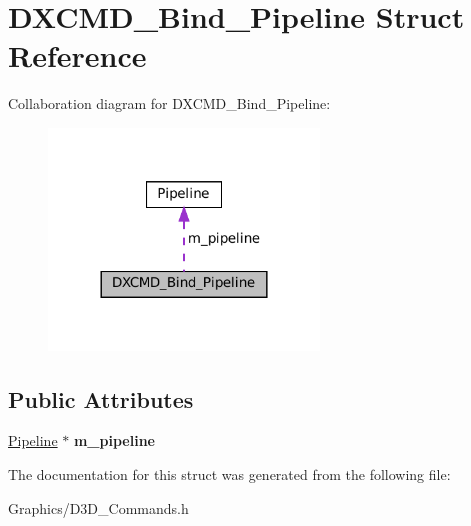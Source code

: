 \hypertarget{structDXCMD__Bind__Pipeline}{}\section{D\+X\+C\+M\+D\+\_\+\+Bind\+\_\+\+Pipeline Struct Reference}
\label{structDXCMD__Bind__Pipeline}


Collaboration diagram for D\+X\+C\+M\+D\+\_\+\+Bind\+\_\+\+Pipeline\+:
\nopagebreak
\begin{figure}[H]
\begin{center}
\leavevmode
\includegraphics[width=204pt]{structDXCMD__Bind__Pipeline__coll__graph}
\end{center}
\end{figure}
\subsection*{Public Attributes}
\begin{DoxyCompactItemize}
\item 
\mbox{\label{structDXCMD__Bind__Pipeline_a314c679c8e740a7bd19410a4db960efa}} 
\hyperlink{classPipeline}{Pipeline} $\ast$ {\bfseries m\+\_\+pipeline}
\end{DoxyCompactItemize}


The documentation for this struct was generated from the following file\+:\begin{DoxyCompactItemize}
\item 
Graphics/D3\+D\+\_\+\+Commands.\+h\end{DoxyCompactItemize}
